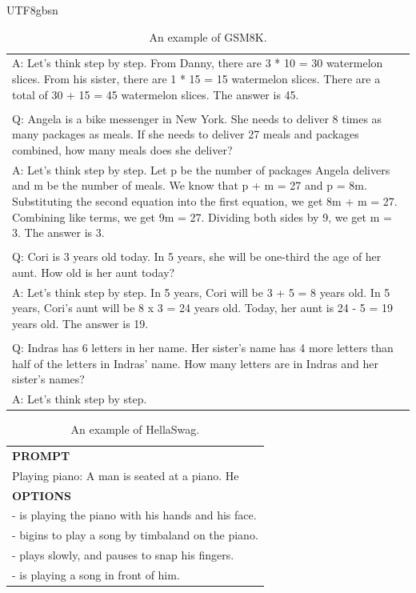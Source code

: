 \documentclass[11pt, a4paper, logo, copyright, nonumbering]{deepseek}
\begin{document}
\begin{CJK*}{UTF8}{gbsn}
\begin{table}[ht]
\begin{tabular}{p{12cm}}
\\A: Let's think step by step. From Danny, there are 3 * 10 = 30 watermelon slices. From his sister, there are 1 * 15 = 15 watermelon slices. There are a total of 30 + 15 = 45 watermelon slices. The answer is 45.
\\
\\Q: Angela is a bike messenger in New York. She needs to deliver 8 times as many packages as meals. If she needs to deliver 27 meals and packages combined, how many meals does she deliver?
\\A: Let's think step by step. Let p be the number of packages Angela delivers and m be the number of meals. We know that p + m = 27 and p = 8m. Substituting the second equation into the first equation, we get 8m + m = 27. Combining like terms, we get 9m = 27. Dividing both sides by 9, we get m = 3. The answer is 3.
\\
\\Q: Cori is 3 years old today. In 5 years, she will be one-third the age of her aunt. How old is her aunt today?
\\A: Let's think step by step. In 5 years, Cori will be 3 + 5 = 8 years old. In 5 years, Cori’s aunt will be 8 x 3 = 24 years old. Today, her aunt is 24 - 5 = 19 years old. The answer is 19.
\\
\\Q: Indras has 6 letters in her name. Her sister's name has 4 more letters than half of the letters in Indras' name. How many letters are in Indras and her sister's names?
\\A: Let's think step by step.\\
\bottomrule
\end{tabular}
    \caption{\centering An example of GSM8K.}
    \label{tab:gsm8k_eval_format_example}
\end{table}

\begin{table}[ht]
    \centering \small
\begin{tabular}{p{12cm}}
\toprule
\textbf{PROMPT}\\
Playing piano: A man is seated at a piano. He\\
\midrule
\textbf{OPTIONS}\\
- is playing the piano with his hands and his face.\\
- bigins to play a song by timbaland on the piano.\\
- plays slowly, and pauses to snap his fingers.\\
- is playing a song in front of him.\\
\bottomrule
\end{tabular}
    \caption{\centering An example of HellaSwag.}
    \label{tab:hellaswag_eval_format_example}
\end{table}


\end{CJK*}
\end{document}
